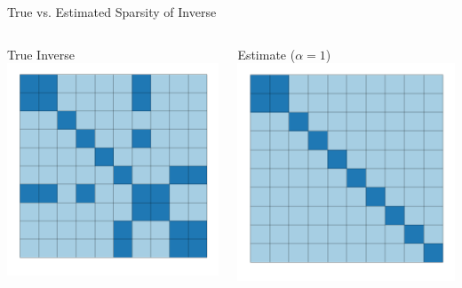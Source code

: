 \documentclass{beamer}
\begin{document}
\begin{frame}{True vs. Estimated Sparsity of Inverse}
	\vfill
	\begin{columns}
		\begin{column}{0.5\textwidth}
			\begin{center}
				True Inverse
				\includegraphics[width=\textwidth]{figs/sparse_cov_true.pdf}
			\end{center}
		\end{column}
		\begin{column}{0.5\textwidth}
			\begin{center}
				Estimate ($\alpha = 1$)
				\includegraphics[width=\textwidth]{figs/sparse_cov_alpha1.pdf}

\end{center}
\end{column}
\end{columns}
\end{frame}
\end{document}
